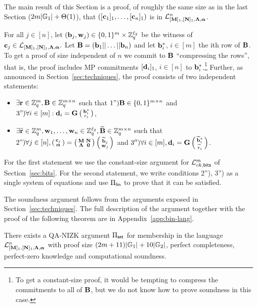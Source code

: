 The main result of this Section is a proof, of roughly the same size as in the last Section ($2{m}|\mathbb{G}_1|+\Theta(1)$), that  $([\mathbf{c}_1]_1,\ldots,[\mathbf{c}_n]_1)$ is in $\mathcal{L}_{[\mathbf{{M}}]_1,[\mathbf{{N}}]_1,\mathbf{{\Lambda}},{\boldsymbol \alpha}}^n$.

For all $j \in [n]$, let $(\mathbf{b}_j,\mathbf{w}_j) \in \{0,1\}^{{m}} \times \mathbb{Z}_q^{{\ell_2}}$ be the witness of $\mathbf{c}_j \in \mathcal{L}_{[\mathbf{{M}}]_1,[\mathbf{{N}}]_1,\mathbf{{\Lambda}},{\boldsymbol \alpha}}.$ Let $\mathbf{{B}}=(\mathbf{b}_1|| \ldots ||\mathbf{b}_n)$ and let $\mathbf{b}^*_{i}$, $i \in [m]$ the ith row of $\mathbf{{B}}$. To get a proof of size independent of $n$ we commit to $\mathbf{{B}}$ ``compressing the rows'', that is, the proof includes MP commitments $[\mathbf{d}_i]_1$, $i \in [n]$ to $\mathbf{b}_i^*$.\footnote{To get a constant-size proof, it would be tempting to compress the commitments to all of $\mathbf{{B}}$, but we do not know how to prove soundness in this case.} Further, as announced in Section~\ref{sec:techniques}, the proof consists of two independent statements:
\begin{itemize}
\item $\exists \mathbf{r} \in \mathbb{Z}_q^{m}, \mathbf{{B}} \in \mathbb{Z}_q^{{m} \times n}$ such that  
$\text{1'')} \mathbf{{B}} \in \{0,1\}^{{m} \times n}$ and $\text{3'')} \forall i \in [{m}]: \mathbf{d}_i=\mathbf{{G}}\left(\begin{smallmatrix}\mathbf{b}_i^*  \\ r_i\end{smallmatrix}\right)$,
\item $\exists \widetilde{\mathbf{r}} \in \mathbb{Z}_q^{m}, \mathbf{w}_1,\ldots,\mathbf{w}_n \in\mathbb{Z}_q^{\ell_2}, \widetilde{\mathbf{{B}}} \in \mathbb{Z}_q^{{m} \times n}$ such that  
   $\text{2'')}\forall j \in [n], \left(\begin{smallmatrix}
    \mathbf{c}_j\\
    {\boldsymbol \alpha}
\end{smallmatrix}\right)
=
\left(\begin{smallmatrix}
    \mathbf{{M}}       & \mathbf{{N}}\\
    \mathbf{{\Lambda}} & \mathbf{{0}}
\end{smallmatrix}\right)
\left(\begin{smallmatrix}
    \widetilde{\mathbf{b}}_j\\
    \mathbf{w}_j
\end{smallmatrix}\right)$ and $3'') \forall i \in [{m}], \mathbf{d}_i=\mathbf{{G}}   \left(\begin{smallmatrix}\widetilde{\mathbf{b}}^*_i  \\ \widetilde{r}_i\end{smallmatrix}\right)  $.
\end{itemize} 
For the first statement we use the constant-size argument for $\mathcal{L}_{ck,\mathsf{bits}}^m$ of Section~\ref{sec:bits}. For the second statement, we write conditions 2''), 3'') as a single system of equations and use $\Pi_{\mathsf{lin}}$ to prove that it can be satisfied. 

The soundness argument follows from the arguments exposed in Section~\ref{sec:techniques}. The full description of the argument together with the proof of the following theorem are in Appendix~\ref{app:bin-lang}.

\begin{theorem} \label{theo:aggset} There exists a QA-NIZK argument $\Pi_{\mathsf{set}}$ for membership in the language $\mathcal{L}_{[\mathbf{{M}}]_1,[\mathbf{{N}}]_1,\mathbf{{\Lambda}},{\boldsymbol \alpha}}^n$ with proof size  $(2{m}+11)|\mathbb{G}_1|+10|\mathbb{G}_2|$, perfect completeness, perfect-zero knowledge and computational soundness. 
\end{theorem}

